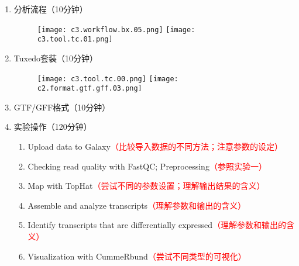 \documentclass{TIJMUjiaoanSY}
\begin{document}

\firstTail


\newpage
\otherHeader

\noindent
\begin{enumerate}
  \item 分析流程（10分钟）
    \begin{figure}[ht]
      \centering
      \texttt{[image: c3.workflow.bx.05.png]}
      \hspace{2em}
      \texttt{[image: c3.tool.tc.01.png]}
    \end{figure}

  \item Tuxedo套装（10分钟）
    \begin{figure}[ht]
      \centering
      \texttt{[image: c3.tool.tc.00.png]}
      \hspace{2em}
      \texttt{[image: c2.format.gtf.gff.03.png]}
    \end{figure}

  \item GTF/GFF格式（10分钟）

  \item 实验操作（120分钟）
    \begin{enumerate}
      \item Upload data to Galaxy\textcolor{red}{（比较导入数据的不同方法；注意参数的设定）}
      \item Checking read quality with FastQC; Preprocessing\textcolor{red}{（参照实验一）}
      \item Map with TopHat\textcolor{red}{（尝试不同的参数设置；理解输出结果的含义）}
      \item Assemble and analyze transcripts\textcolor{red}{（理解参数和输出的含义）}
      \item Identify transcripts that are differentially expressed\textcolor{red}{（理解参数和输出的含义）}
      \item Visualization with CummeRbund\textcolor{red}{（尝试不同类型的可视化）}
    \end{enumerate}
\end{enumerate}


\otherTail
\end{document}
